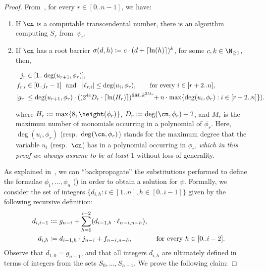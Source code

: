 \begin{proof}
  From~, for every $r
  \in [0..n-1]$, we have:
  \begin{enumerate}
    \item\label{pp6:itemOne} If $\cn$ is a computable transcendental number,
    there is an algorithm computing $S_r$ from~$\psi_r$.
    \item\label{pp6:itemTwo} If $\cn$ has a root barrier $\sigma(d,h) \coloneqq
    c \cdot (d+\left\lceil\ln(h)\right\rceil)^k$, for some $c,k \in \N_{\geq 1}$, then,
    \begin{center}
      $\begin{aligned}
      j_r &\in [1..\deg(u_{r+1},\phi_r)],\\
      f_{r,i} &\in [0..j_r-1] \ \text{ and } \ \left|\ell_{r,i}\right| \leq \deg(u_i,\phi_r), \qquad\text{for every } i \in [r+2..n],\\
      \left|g_r\right| &\leq \deg(u_{r+1},\phi_r) \cdot ((2^{4c} D_r \cdot \left\lceil\ln(H_r)\right\rceil)^{6 M_r k^{3M_r}}\!\!+n \cdot \max\{\deg(u_i,\phi_r) : i \in [r+2..n]\}).
      \end{aligned}$
    \end{center}
    where $H_r \coloneqq \max\{8,\height(\phi_r)\}$, $D_r \coloneqq
    \deg(\cn,\phi_r)+2$, and $M_r$ is the maximum number of monomials occurring
    in a polynomial of $\phi_r$. Here, $\deg(u_i,\phi_r)$
    (resp.~$\deg(\cn,\phi_r)$) stands for the maximum degree that the variable
    $u_i$ (resp.~$\cn$) has in a polynomial occurring in $\phi_r$, \emph{which in this
    proof we always assume to be at least $1$} without loss of generality.
  \end{enumerate}

  As explained in~, we can
  ``backpropagate'' the substitutions performed to define the formulae
  $\phi_1,\dots,\phi_n$ () in order to obtain a solution for
  $\psi$. Formally, we consider the set of integers $\{d_{i,h} : i \in [1..n], h
  \in [0..i-1]\}$ given by the following recursive definition: 
  \begin{align}
    d_{i,i-1} &\coloneqq g_{n-i} + \sum_{h=0}^{i-2} (d_{i-1,h} \cdot \ell_{n-i,n-h}), \notag\\
    d_{i,h} &\coloneqq d_{i-1,h} \cdot j_{n-i} + f_{n-i,n-h},
    &\text{ for every } h \in [0..i-2].
    \label{eq:def-dih}
  \end{align}
  Observe that $d_{1,0} = g_{n-1}$, and that all integers $d_{i,h}$ are
  ultimately defined in terms of integers from the sets $S_0,\dots,S_{n-1}$. We
  prove the following claim:


\end{proof}
